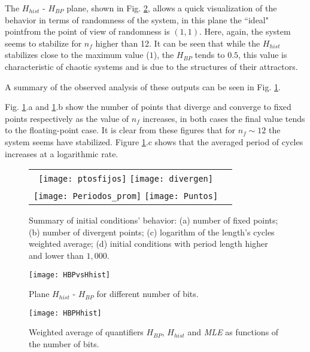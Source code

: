 The $H_{hist}$ - $H_{BP}$ plane, shown in Fig. \ref{fig:HBPvsHhist}, allows a quick visualization of the behavior in terms of randomness of the system, in this plane the ``ideal" pointfrom the point of view of randomness is $(1,1)$. Here, again, the system seems to stabilize for $n_f$ higher than 12. It can be seen that while the $H_{hist}$ stabilizes close to the maximum value ($1$), the $H_{BP}$ tends to $ 0.5$, this value is characteristic of chaotic systems and is due to the structures of their attractors.

A summary of the observed analysis of these outputs can be seen in Fig. \ref{puntos}.

Fig. \ref{puntos}.a and \ref{puntos}.b show the
number of points that diverge and converge to fixed points
respectively as the value of $n_f$ increases, in both cases the
final value tends to the floating-point case. It is clear from
these figures that for $n_f \sim 12$ the system seems have stabilized. Figure
\ref{puntos}.c shows that the averaged period of cycles increases at a logarithmic rate.



\begin{figure}
\begin{tabular}{cc}
\texttt{[image: ptosfijos]}
\texttt{[image: divergen]}\\
\texttt{[image: Periodos\_prom]}
\texttt{[image: Puntos]}
\end{tabular}
\caption{Summary of initial conditions' behavior:
(a) number of fixed points; (b) number of divergent points; (c) logarithm of the length's cycles weighted average;  (d) initial conditions with period length higher and lower than $1,000$.}
\label{puntos}
\end{figure}
\begin{figure}
    \centering
        \texttt{[image: HBPvsHhist]}\\
    \caption{Plane $H_{hist}$ - $H_{BP}$  for different number of bits. }\label{fig:HBPvsHhist}
\end{figure}


\begin{figure}
    \centering
        \texttt{[image: HBPHhist]}\\
    \caption{Weighted average of quantifiers $H_{BP}$,  $H_{hist}$ and \textsl{MLE} as functions of the number of bits.}\label{fig:HBPHhist}
\end{figure}

